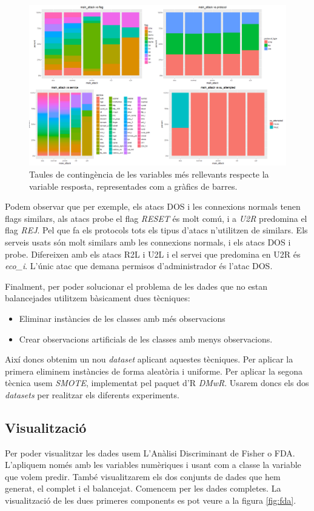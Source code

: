 \documentclass[a4paper]{article} %
\begin{document}
\begin{figure}[H]
	\centering
	\includegraphics[scale=0.85]{cont.png}
	\caption{Taules de contingència de les variables més rellevants respecte la variable resposta, representades com a gràfics de barres. }
	\label{fig:cont}
\end{figure}

Podem observar que per exemple, els atacs DOS i les connexions normals tenen flags similars, als atacs probe el flag \textit{RESET} és molt comú, i a \textit{U2R} predomina el flag \textit{REJ}. Pel que fa els protocols tots els tipus d'atacs n'utilitzen de similars. Els serveis usats són molt similars amb les connexions normals, i els atacs DOS i probe. Difereixen amb els atacs R2L i U2L i el servei que predomina en U2R és \textit{eco\_i}. L'únic atac que demana permisos d'administrador és l'atac DOS.

Finalment, per poder solucionar el problema de les dades que no estan balancejades utilitzem bàsicament dues tècniques:
\begin{itemize}
    \item Eliminar instàncies de les classes amb més observacions
    \item Crear observacions artificials de les classes amb menys observacions.
\end{itemize}
Així doncs obtenim un nou \textit{dataset} aplicant aquestes tècniques. Per aplicar la primera eliminem instàncies de forma aleatòria i uniforme. Per aplicar la segona tècnica usem \textit{SMOTE}\cite{SMOTE}, implementat pel paquet d'R \textit{DMwR}\cite{DMwR}. Usarem doncs els dos \textit{datasets} per realitzar els diferents experiments.

\subsection{Visualització}
Per poder visualitzar les dades usem L'Anàlisi Discriminant de Fisher o FDA. L'apliquem només amb les variables numèriques i usant com a classe la variable que volem predir. També visualitzarem els dos conjunts de dades que hem generat, el complet i el balancejat. Comencem per les dades completes. La visualització de les dues primeres components es pot veure a la figura \ref{fig:fda}.
\end{document}
